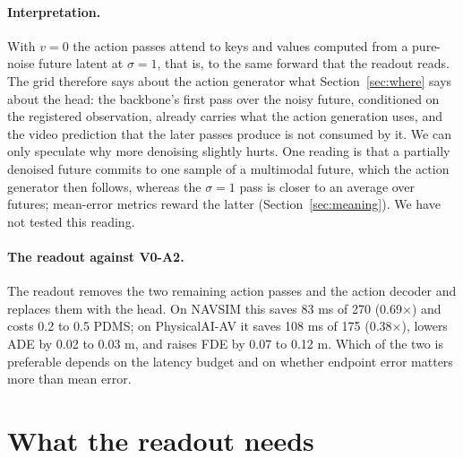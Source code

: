 \documentclass[10pt]{article}
\newcommand{\VA}[2]{V#1-A#2}
\begin{document}
\paragraph{Interpretation.} With $v = 0$ the action passes attend to keys and values computed from a pure-noise future latent at $\sigma = 1$, that is, to the same forward that the readout reads. The grid therefore says about the action generator what Section~\ref{sec:where} says about the head: the backbone's first pass over the noisy future, conditioned on the registered observation, already carries what the action generation uses, and the video prediction that the later passes produce is not consumed by it. We can only speculate why more denoising slightly hurts. One reading is that a partially denoised future commits to one sample of a multimodal future, which the action generator then follows, whereas the $\sigma = 1$ pass is closer to an average over futures; mean-error metrics reward the latter (Section~\ref{sec:meaning}). We have not tested this reading.

\paragraph{The readout against \VA{0}{2}.} The readout removes the two remaining action passes and the action decoder and replaces them with the head. On NAVSIM this saves 83 ms of 270 (0.69$\times$) and costs 0.2 to 0.5 PDMS; on PhysicalAI-AV it saves 108 ms of 175 (0.38$\times$), lowers ADE by 0.02 to 0.03 m, and raises FDE by 0.07 to 0.12 m. Which of the two is preferable depends on the latency budget and on whether endpoint error matters more than mean error.

\section{What the readout needs}
\label{sec:needs}
\end{document}

